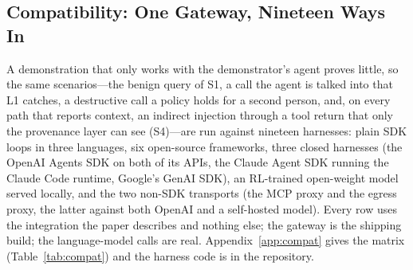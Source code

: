 \subsection{Compatibility: One Gateway, Nineteen Ways In}
\label{sec:compat}

A demonstration that only works with the demonstrator's agent proves
little, so the same scenarios---the benign query of S1, a call the
agent is talked into that L1 catches, a destructive call a policy
holds for a second person, and, on every path that reports context, an
indirect injection through a tool return that only the provenance layer
can see (S4)---are run against nineteen harnesses: plain
SDK loops in three languages, six open-source frameworks, three
closed harnesses (the OpenAI Agents SDK on both of its APIs, the Claude
Agent SDK running the Claude Code runtime, Google's GenAI SDK), an
RL-trained open-weight model served locally, and the two non-SDK
transports (the MCP proxy and the egress proxy, the latter against both
OpenAI and a self-hosted model). Every row uses the integration the
paper describes and nothing else; the gateway is the shipping build; the
language-model calls are real. Appendix~\ref{app:compat} gives the matrix
(Table~\ref{tab:compat}) and the harness code is in the repository.


